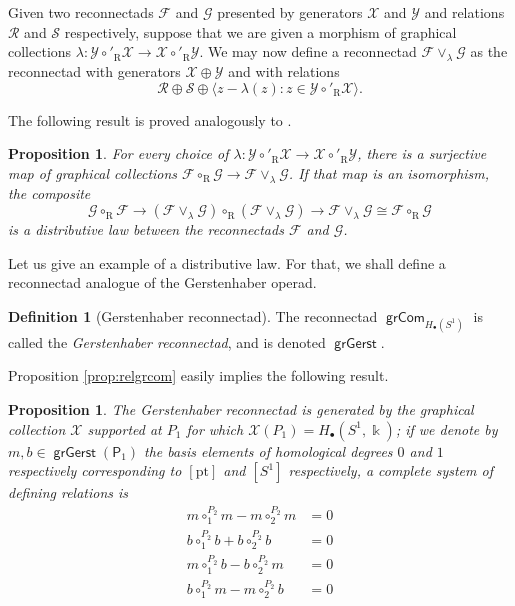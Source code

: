 \documentclass[11pt]{article}
\newtheorem{prop}[theo]{Proposition}
\theoremstyle{definition}
\newtheorem{defi}[theo]{Definition}
\numberwithin{equation}{section}
\newcommand\calF{\mathcal{F}}
\newcommand\calG{\mathcal{G}}
\newcommand\calR{\mathcal{R}}
\newcommand\calS{\mathcal{S}}
\newcommand\calX{\mathcal{X}}
\newcommand\calY{\mathcal{Y}}
\DeclareMathOperator{\rmR}{\mathrm{R}}
\DeclareMathOperator{\grCom}{\mathsf{grCom}}
\DeclareMathOperator{\grGerst}{\mathsf{grGerst}}
\newcommand\kk{\Bbbk}
\begin{document}
Given two reconnectads $\calF$ and $\calG$ presented by generators $\calX$ and $\calY$ and relations $\calR$ and $\calS$ respectively, suppose that we are given a morphism of graphical collections $\lambda\colon \calY \circ'_{\rmR} \calX \rightarrow \calX\circ'_{\rmR}\calY$. We may now define a reconnectad $\calF\vee_{\lambda}\calG$ as the reconnectad with generators $\calX\oplus\calY$ and with relations
 \[
\calR\oplus\calS\oplus\langle z-\lambda(z)\colon z\in \calY \circ'_{\rmR} \calX\rangle.
 \]

The following result is proved analogously to \cite[Prop.~8.6.4]{MR2954392}.

\begin{prop}
For every choice of $\lambda\colon \calY \circ'_{\rmR} \calX \rightarrow \calX\circ'_{\rmR}\calY$, there is a surjective map of graphical collections $\calF\circ_{\rmR}\calG\to \calF\vee_{\lambda}\calG$. If that map is an isomorphism, the composite
\[
\calG\circ_{\rmR} \calF \rightarrow (\calF\vee_{\lambda}\calG)\circ_{\rmR} (\calF\vee_{\lambda}\calG)\to \calF\vee_{\lambda}\calG \cong\calF\circ_{\rmR} \calG
\]
is a distributive law between the reconnectads $\calF$ and $\calG$.
\end{prop}

Let us give an example of a distributive law. For that, we shall define a reconnectad analogue of the Gerstenhaber operad.

\begin{defi}[Gerstenhaber reconnectad]
The reconnectad $\grCom_{H_\bullet(S^1)}$ is called the \emph{Gerstenhaber reconnectad}, and is denoted $\grGerst$.
\end{defi}

Proposition \ref{prop:relgrcom} easily implies the following result.

\begin{prop}\label{prop:relgerst}
The Gerstenhaber reconnectad is generated by the graphical collection $\calX$ supported at $P_1$ for which $\calX(P_1)=H_\bullet(S^1,\kk)$; if we denote by $m,b\in \grGerst(\mathsf{P}_1)$ the basis elements of homological degrees $0$ and $1$ respectively corresponding to $[\mathrm{pt}]$ and $[S^1]$ respectively, a complete system of defining relations is
\begin{align}
m\circ_{1}^{P_2} m - m\circ_{2}^{P_2} m &= 0\\
b\circ_{1}^{P_2} b + b\circ_{2}^{P_2} b &= 0\\
m\circ_{1}^{P_2} b - b\circ_{2}^{P_2} m &= 0\\
b\circ_{1}^{P_2} m - m\circ_{2}^{P_2} b &= 0
\end{align}
\end{prop}
\end{document}
